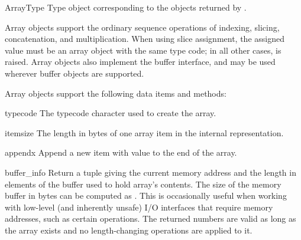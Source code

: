 \begin{datadesc}{ArrayType}
Type object corresponding to the objects returned by
.
\end{datadesc}


Array objects support the ordinary sequence operations of
indexing, slicing, concatenation, and multiplication.  When using
slice assignment, the assigned value must be an array object with the
same type code; in all other cases,  is raised.
Array objects also implement the buffer interface, and may be used
wherever buffer objects are supported.

Array objects support the following data items and methods:

\begin{memberdesc}[array]{typecode}
The typecode character used to create the array.
\end{memberdesc}

\begin{memberdesc}[array]{itemsize}
The length in bytes of one array item in the internal representation.
\end{memberdesc}


\begin{methoddesc}[array]{append}{x}
Append a new item with value  to the end of the array.
\end{methoddesc}

\begin{methoddesc}[array]{buffer_info}{}
Return a tuple  giving the current
memory address and the length in elements of the buffer used to hold
array's contents.  The size of the memory buffer in bytes can be
computed as .  This is occasionally useful when working with
low-level (and inherently unsafe) I/O interfaces that require memory
addresses, such as certain  operations.  The
returned numbers are valid as long as the array exists and no
length-changing operations are applied to it.

\end{methoddesc}

